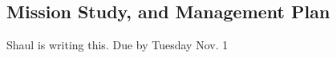
\subsection{Mission Study, and Management Plan  }
\label{sec:management}

\vspace{-0.05in}


Shaul is writing this. Due by Tuesday Nov. 1
